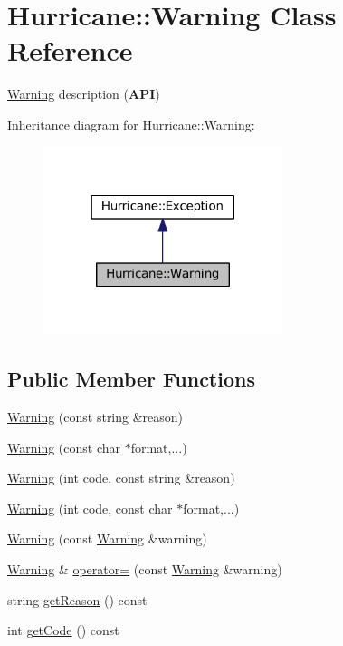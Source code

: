 \hypertarget{classHurricane_1_1Warning}{}\section{Hurricane\+:\+:Warning Class Reference}
\label{classHurricane_1_1Warning}


\mbox{\hyperlink{classHurricane_1_1Warning}{Warning}} description ({\bfseries A\+PI})  




Inheritance diagram for Hurricane\+:\+:Warning\+:\nopagebreak
\begin{figure}[H]
\begin{center}
\leavevmode
\includegraphics[width=198pt]{classHurricane_1_1Warning__inherit__graph}
\end{center}
\end{figure}
\subsection*{Public Member Functions}
\begin{DoxyCompactItemize}
\item 
\mbox{\hyperlink{classHurricane_1_1Warning_aea7aa9bccac13e6c15b1eb3b4741ef0d}{Warning}} (const string \&reason)
\item 
\mbox{\hyperlink{classHurricane_1_1Warning_a93bdec83d118f235def1d354938c0529}{Warning}} (const char $\ast$format,...)
\item 
\mbox{\hyperlink{classHurricane_1_1Warning_a95e98968e28550678f1ed91193f8ee5f}{Warning}} (int code, const string \&reason)
\item 
\mbox{\hyperlink{classHurricane_1_1Warning_aad9cf84a9c08fb2012462e6f38450bf0}{Warning}} (int code, const char $\ast$format,...)
\item 
\mbox{\hyperlink{classHurricane_1_1Warning_a5855a8066401c0b1d1b830a3f7c6216e}{Warning}} (const \mbox{\hyperlink{classHurricane_1_1Warning}{Warning}} \&warning)
\item 
\mbox{\hyperlink{classHurricane_1_1Warning}{Warning}} \& \mbox{\hyperlink{classHurricane_1_1Warning_a21827cacf1cb4f53d8a1963bdeb3cd50}{operator=}} (const \mbox{\hyperlink{classHurricane_1_1Warning}{Warning}} \&warning)
\item 
string \mbox{\hyperlink{classHurricane_1_1Warning_afe26e9c4e0801d112d743d8afe8c3ac3}{get\+Reason}} () const
\item 
int \mbox{\hyperlink{classHurricane_1_1Warning_a28350d25d1691b754fd8d79d1539234c}{get\+Code}} () const
\end{DoxyCompactItemize}
